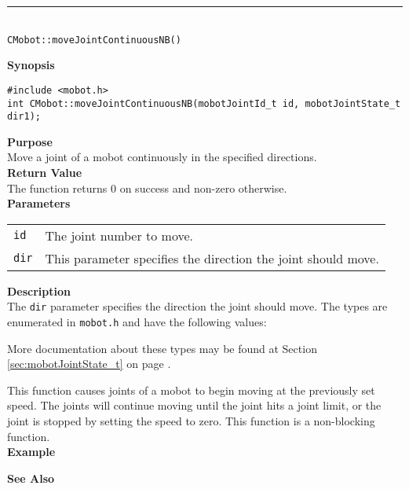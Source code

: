 \noindent
\vspace{5pt}
\rule{4.5in}{0.015in}\\
\noindent
{\LARGE \texttt{CMobot::moveJointContinuousNB()}}\\
{}

\noindent
{\bf Synopsis}
\vspace{-8pt}
\begin{verbatim}
#include <mobot.h>
int CMobot::moveJointContinuousNB(mobotJointId_t id, mobotJointState_t dir1);
\end{verbatim}

\noindent
{\bf Purpose}\\
Move a joint of a mobot continuously in the specified directions.\\

\noindent
{\bf Return Value}\\
The function returns 0 on success and non-zero otherwise.\\

\noindent
{\bf Parameters}\\
\vspace{-0.1in}
\begin{description}
\item               
\begin{tabular}{p{10 mm}p{145 mm}}
\texttt{id} & The joint number to move. \\
\texttt{dir} &  
This parameter specifies the direction the joint should move. \\
\end{tabular}
\end{description}

\noindent
{\bf Description}\\
The \texttt{dir} parameter specifies the direction the joint should move.
The types
are enumerated in \texttt{mobot.h} and have the following values:

More documentation about these types may be found at Section
\ref{sec:mobotJointState_t} on page
\pageref{sec:mobotJointState_t}.  

This function causes joints of a mobot to begin moving at the previously set
speed. The joints will continue moving until the joint hits a joint limit, or
the joint is stopped by setting the speed to zero. This function is a non-blocking
function.\\

\noindent
{\bf Example}\\
\noindent

\noindent
{\bf See Also}\\

